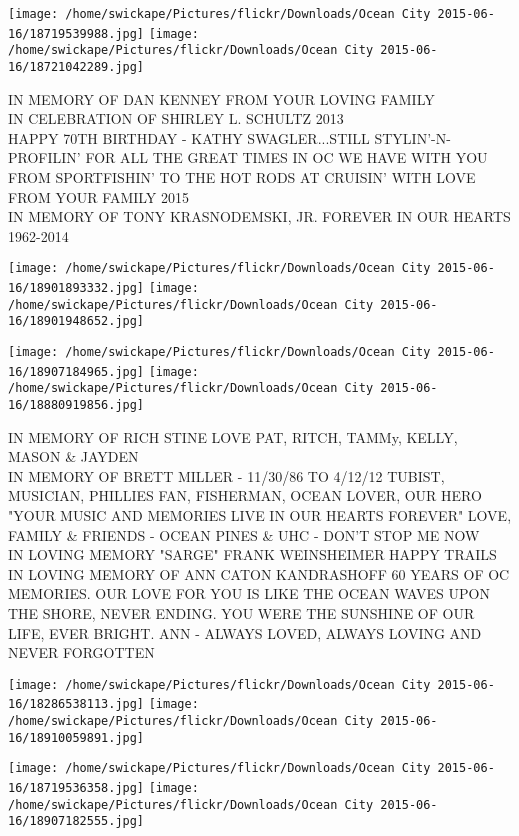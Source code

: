 \documentclass[10pt,letterpaper]{article}
\begin{document}
\texttt{[image: /home/swickape/Pictures/flickr/Downloads/Ocean City 2015-06-16/18719539988.jpg]}
\texttt{[image: /home/swickape/Pictures/flickr/Downloads/Ocean City 2015-06-16/18721042289.jpg]}

IN MEMORY OF DAN KENNEY FROM YOUR LOVING FAMILY\\
IN CELEBRATION OF SHIRLEY L. SCHULTZ 2013\\
HAPPY 70TH BIRTHDAY {-} KATHY SWAGLER...STILL STYLIN'{-}N{-}PROFILIN' FOR ALL THE GREAT TIMES IN OC WE HAVE WITH YOU FROM SPORTFISHIN' TO THE HOT RODS AT CRUISIN' WITH LOVE FROM YOUR FAMILY 2015\\
IN MEMORY OF TONY KRASNODEMSKI, JR.  FOREVER IN OUR HEARTS 1962{-}2014
\pagebreak

\texttt{[image: /home/swickape/Pictures/flickr/Downloads/Ocean City 2015-06-16/18901893332.jpg]}
\texttt{[image: /home/swickape/Pictures/flickr/Downloads/Ocean City 2015-06-16/18901948652.jpg]}

\texttt{[image: /home/swickape/Pictures/flickr/Downloads/Ocean City 2015-06-16/18907184965.jpg]}
\texttt{[image: /home/swickape/Pictures/flickr/Downloads/Ocean City 2015-06-16/18880919856.jpg]}

IN MEMORY OF RICH STINE LOVE PAT, RITCH, TAMMy, KELLY, MASON \& JAYDEN\\
IN MEMORY OF BRETT MILLER {-} 11/30/86 TO 4/12/12 TUBIST, MUSICIAN, PHILLIES FAN, FISHERMAN, OCEAN LOVER, OUR HERO "YOUR MUSIC AND MEMORIES LIVE IN OUR HEARTS FOREVER" LOVE, FAMILY \& FRIENDS {-} OCEAN PINES \& UHC {-} DON'T STOP ME NOW\\
IN LOVING MEMORY "SARGE" FRANK WEINSHEIMER HAPPY TRAILS\\
IN LOVING MEMORY OF ANN CATON KANDRASHOFF 60 YEARS OF OC MEMORIES.  OUR LOVE FOR YOU IS LIKE THE OCEAN WAVES UPON THE SHORE, NEVER ENDING.  YOU WERE THE SUNSHINE OF OUR LIFE, EVER BRIGHT.  ANN {-} ALWAYS LOVED, ALWAYS LOVING AND NEVER FORGOTTEN
\pagebreak

\texttt{[image: /home/swickape/Pictures/flickr/Downloads/Ocean City 2015-06-16/18286538113.jpg]}
\texttt{[image: /home/swickape/Pictures/flickr/Downloads/Ocean City 2015-06-16/18910059891.jpg]}

\texttt{[image: /home/swickape/Pictures/flickr/Downloads/Ocean City 2015-06-16/18719536358.jpg]}
\texttt{[image: /home/swickape/Pictures/flickr/Downloads/Ocean City 2015-06-16/18907182555.jpg]}
\end{document}
